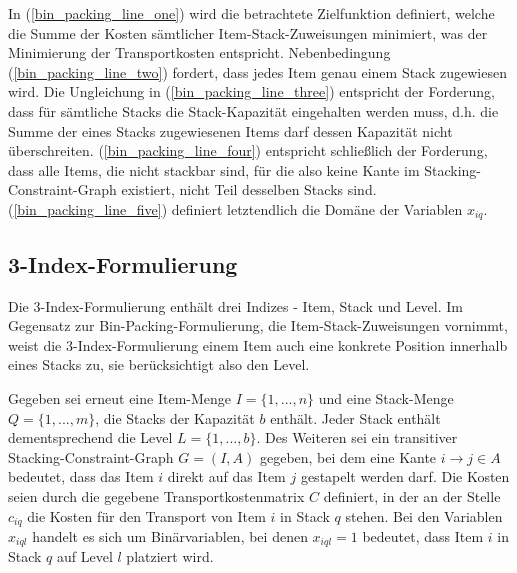 In (\ref{bin_packing_line_one}) wird die betrachtete Zielfunktion definiert, welche die Summe der Kosten sämtlicher
Item-Stack-Zuweisungen minimiert, was der Minimierung der Transportkosten entspricht.
Nebenbedingung (\ref{bin_packing_line_two}) fordert, dass jedes Item genau einem Stack zugewiesen wird. Die Ungleichung in (\ref{bin_packing_line_three}) entspricht der Forderung, dass für sämtliche Stacks die Stack-Kapazität eingehalten werden muss, d.h.
die Summe der eines Stacks zugewiesenen Items darf dessen Kapazität nicht überschreiten. (\ref{bin_packing_line_four}) entspricht schließlich der Forderung, dass alle Items, die nicht stackbar sind, für die also keine Kante im Stacking-Constraint-Graph existiert, nicht Teil desselben Stacks sind. (\ref{bin_packing_line_five}) definiert letztendlich die Domäne der Variablen $x_{iq}$.

\subsection{3-Index-Formulierung}
\label{sec:three_idx_formulation}

Die 3-Index-Formulierung enthält drei Indizes - Item, Stack und Level.
Im Gegensatz zur Bin-Packing-Formulierung, die Item-Stack-Zuweisungen vornimmt, weist die 3-Index-Formulierung einem
Item auch eine konkrete Position innerhalb eines Stacks zu, sie berücksichtigt also den Level.

Gegeben sei erneut eine Item-Menge $I = \{1, ..., n\}$ und eine Stack-Menge $Q = \{1, ..., m\}$, die Stacks der Kapazität $b$ enthält.
Jeder Stack enthält dementsprechend die Level $L = \{1, ..., b\}$. Des Weiteren sei ein transitiver Stacking-Constraint-Graph
$G = (I, A)$ gegeben, bei dem eine Kante $i \rightarrow j \in A$ bedeutet, dass das Item $i$ direkt auf das Item $j$ gestapelt werden darf.
Die Kosten seien durch die gegebene Transportkostenmatrix $C$ definiert, in der an der Stelle $c_{iq}$ die Kosten für den
Transport von Item $i$ in Stack $q$ stehen. Bei den Variablen $x_{iql}$ handelt es sich um Binärvariablen,
bei denen $x_{iql} = 1$ bedeutet, dass Item $i$ in Stack $q$ auf Level $l$ platziert wird.

